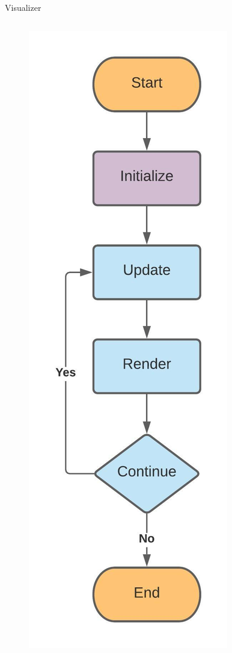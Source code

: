 \documentclass{presentation}
\begin{document}
\begin{frame}{Visualizer}
\begin{columns}
\begin{figure}
            \includegraphics[scale=0.45]{visualizer_render_loop.jpg}
        \end{figure}
    \end{columns}
\end{frame}
\end{document}
